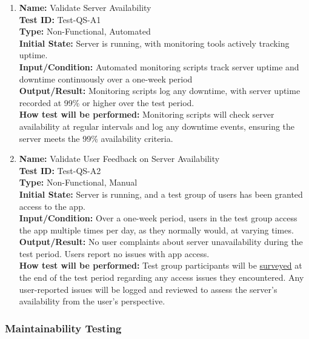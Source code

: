 \documentclass[12pt, titlepage]{article}
\begin{document}
\begin{enumerate}

\item \textbf{Name:} Validate Server Availability \label{itm:Test-QS-A1} \\
    \textbf{Test ID:} Test-QS-A1 \\
    \textbf{Type:} Non-Functional, Automated \\
    \textbf{Initial State:} Server is running, with monitoring tools actively tracking uptime. \\
    \textbf{Input/Condition:} Automated monitoring scripts track server uptime and downtime continuously over a one-week period \\
    \textbf{Output/Result:} Monitoring scripts log any downtime, with server uptime recorded at 99\% or higher over the test period. \\
    \textbf{How test will be performed:} Monitoring scripts will check server availability at regular intervals and log any downtime events, ensuring the server meets the 99\% availability criteria.


\item \textbf{Name:} Validate User Feedback on Server Availability \label{itm:Test-QS-A2} \\
    \textbf{Test ID:} Test-QS-A2 \\
    \textbf{Type:} Non-Functional, Manual \\
    \textbf{Initial State:} Server is running, and a test group of users has been granted access to the app. \\
    \textbf{Input/Condition:} Over a one-week period, users in the test group access the app multiple times per day, as they normally would, at varying times. \\
    \textbf{Output/Result:} No user complaints about server unavailability during the test period. Users report no issues with app access. \\
    \textbf{How test will be performed:} Test group participants will be \hyperref[sub:usability_survey]{surveyed} at the end of the test period regarding any access issues they encountered. Any user-reported issues will be logged and reviewed to assess the server's availability from the user’s perspective.

\end{enumerate}
\subsubsection{Maintainability Testing}
\end{document}
